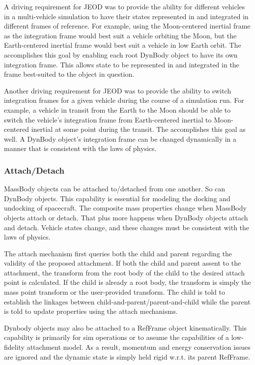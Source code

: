 A driving requirement for JEOD was to provide the ability for different
vehicles in a multi-vehicle simulation to have their states represented in
and integrated in different frames of reference.
For example, using the Moon-centered inertial frame as the
integration frame would best suit a vehicle orbiting the Moon, but the
Earth-centered inertial frame would best suit a vehicle in low Earth orbit.
The \ModelDesc accomplishes this goal by enabling each root DynBody object to
have its own integration frame. This allows state to be represented in and
integrated in the frame best-suited to the object in question.

Another driving requirement for JEOD was to provide the ability to switch
integration frames for a given vehicle during the course of a simulation run.
For example, a vehicle in transit from the Earth to the Moon should be able
to switch the vehicle's integration frame from Earth-centered inertial to
Moon-centered inertial at some point during the transit. The \ModelDesc
accomplishes this goal as well. A DynBody object's integration frame can
be changed dynamically in a manner that is consistent with the laws of physics.

\subsubsection{Attach/Detach}\label{sec:key_attach_detach}
MassBody objects can be attached to/detached from one another. So can
DynBody objects. This capability is essential for modeling the docking and
undocking of spacecraft. The composite mass properties change when MassBody
objects attach or detach. That plus more happens when DynBody objects attach
and detach. Vehicle states change, and these changes must be consistent
with the laws of physics.

The \ModelDesc attach mechanism first queries both the child and parent regarding the validity of the proposed
attachment. If both the child and parent assent to the attachment, the transform from the root body of the child
to the desired attach point is calculated. If the child is already a root body, the transform is simply the mass point
transform or the user-provided transform. The child is told to establish the linkages between
child-and-parent/parent-and-child while the parent is told to update properties using the \MASS attach mechanisms.

Dynbody objects may also be attached to a RefFrame object kinematically. This capability is primarily for sim
operations or to assume the capabilities of a low-fidelity attachment model. As a result, momentum and energy
conservation issues are ignored and the dynamic state is simply held rigid w.r.t. its parent RefFrame.

